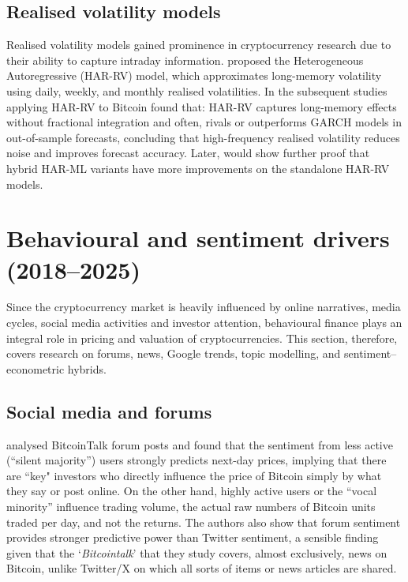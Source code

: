\documentclass[12pt]{report}
\begin{document}
\subsection{Realised volatility models}

Realised volatility models gained prominence in cryptocurrency research due to their ability to capture intraday information. \cite{corsi2009har} proposed the Heterogeneous Autoregressive (HAR-RV) model, which approximates long-memory volatility using daily, weekly, and monthly realised volatilities. In the subsequent studies applying HAR-RV to Bitcoin found that: HAR-RV captures long-memory effects without fractional integration and often, rivals or outperforms GARCH models in out-of-sample forecasts, concluding that high-frequency realised volatility reduces noise and improves forecast accuracy. Later,  \cite{dudek2023bitcoinrv} would show further proof that hybrid HAR-ML variants have more improvements on the standalone HAR-RV models.

\section{Behavioural and sentiment drivers (2018–2025)}
Since the cryptocurrency market is heavily influenced by online narratives, media cycles, social media activities and investor attention, behavioural finance plays an integral role in pricing and valuation of cryptocurrencies. This section, therefore, covers research on forums, news, Google trends, topic modelling, and sentiment–econometric hybrids.

\subsection{Social media and forums}

\cite{mai2018silentmajority} analysed BitcoinTalk forum posts and found that the sentiment from less active (“silent majority”) users strongly predicts next-day prices, implying that there are ``key" investors who directly influence the price of Bitcoin simply by what they say or post online. On the other hand, highly active users or the “vocal minority” influence trading volume, the actual raw numbers of Bitcoin units traded per day, and not the returns. The authors also show that forum sentiment provides stronger predictive power than Twitter sentiment, a sensible finding given that the `\textit{Bitcointalk}' that they study covers, almost exclusively, news on Bitcoin, unlike Twitter/X on which all sorts of items or news articles are shared.
\end{document}
